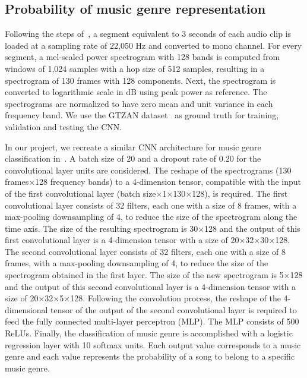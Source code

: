 \documentclass{article}
\begin{document}
\subsection{Probability of music genre representation}

Following the steps of~\cite{NIPS2013_5004}, a segment equivalent to 3 seconds of each audio clip is loaded at a sampling rate of 22,050 Hz and converted to mono channel. For every segment, a mel-scaled power spectrogram with 128 bands is computed from windows of 1,024 samples with a hop size of 512 samples, resulting in a spectrogram of 130 frames with 128 components. Next, the spectrogram is converted to logarithmic scale in dB using peak power as reference. The spectrograms are normalized to have zero mean and unit variance in each frequency band. We use the GTZAN dataset~\cite{Tzanetakis2002293} as ground truth for training, validation and testing the CNN.

In our project, we recreate a similar CNN architecture for music genre classification in~\cite{DBLP:journals/corr/KereliukSL15}. A batch size of 20 and a dropout rate of 0.20 for the convolutional layer units are considered. The reshape of the spectrograms (130 frames$\times$128 frequency bands) to a 4-dimension tensor, compatible with the input of the first convolutional layer (batch size$\times$1$\times$130$\times$128), is required. The first convolutional layer consists of 32 filters, each one with a size of 8 frames, with a max-pooling downsampling of 4, to reduce the size of the spectrogram along the time axis. The size of the resulting spectrogram is 30$\times$128 and the output of this first convolutional layer is a 4-dimension tensor with a size of 20$\times$32$\times$30$\times$128. The second convolutional layer consists of 32 filters, each one with a size of 8 frames, with a max-pooling downsampling of 4, to reduce the size of the spectrogram obtained in the first layer. The size of the new spectrogram is 5$\times$128 and the output of this second convolutional layer is a 4-dimension tensor with a size of 20$\times$32$\times$5$\times$128. Following the convolution process, the reshape of the 4-dimensional tensor of the output of the second convolutional layer is required to feed the fully connected multi-layer perceptron (MLP). The MLP consists of 500 ReLUs. Finally, the classification of music genre is accomplished with a logistic regression layer with 10 softmax units. Each output value corresponds to a music genre and each value represents the probability of a song to belong to a specific music genre.
\end{document}
